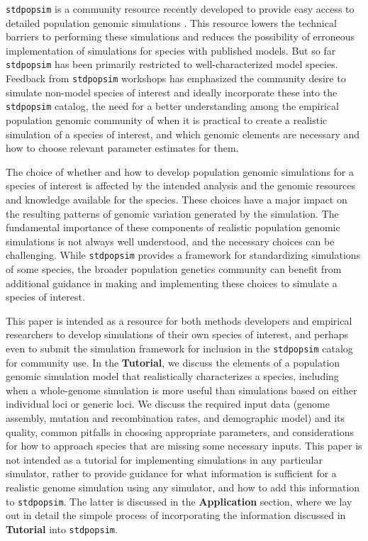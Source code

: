 \documentclass[hidelinks]{article}
\newcommand{\stdpopsim}{\texttt{stdpopsim}\xspace}
\begin{document}
\stdpopsim is a community resource recently developed to provide easy
access to detailed population genomic simulations \citep{Adrion2020}. This
resource lowers the technical barriers to performing these simulations
and reduces the possibility of erroneous implementation of simulations
for species with published models. But so far \stdpopsim has been
primarily restricted to well-characterized model species. Feedback from
\stdpopsim workshops has emphasized the community desire to simulate
non-model species of interest and ideally incorporate these into the \stdpopsim catalog,
the need for a better understanding among the empirical population
genomic community of when it is practical to create a realistic
simulation of a species of interest, and which genomic elements are
necessary and how to choose relevant parameter estimates for them.

The choice of whether and how to develop population genomic
simulations for a species of interest is affected by the intended
analysis and the genomic resources and knowledge available for the
species. These choices have a major impact on the resulting patterns of
genomic variation generated by the simulation. The fundamental
importance of these components of realistic population genomic
simulations is not always well understood, and the necessary choices can
be challenging. While \stdpopsim provides a framework for standardizing
simulations of some species, the broader population genetics community
can benefit from additional guidance in making and implementing these
choices to simulate a species of interest.

This paper is intended as a resource for both methods
developers and empirical researchers to develop simulations of their own
species of interest, and perhaps even to submit the simulation
framework for inclusion in the \stdpopsim catalog for community use.
In the \textbf{Tutorial}, we discuss the elements of a
population genomic simulation model that realistically characterizes a
species, including when a whole-genome simulation is more useful than
simulations based on either individual loci or generic loci.
We discuss the required input data (genome assembly, 
mutation and recombination rates, and demographic model) and
its quality, common pitfalls in choosing appropriate parameters, and
considerations for how to approach species that are missing some
necessary inputs. This paper is not intended as a tutorial for
implementing simulations in any particular simulator, rather to provide
guidance for what information is sufficient for a realistic genome simulation
using any simulator, and how to add this information to \stdpopsim. The latter 
is discussed in the \textbf{Application} section, where we lay out in
detail the simpole process of incorporating the information discussed 
in \textbf{Tutorial} into \stdpopsim. 
\end{document}
